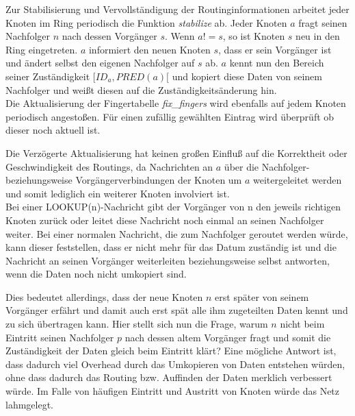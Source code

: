 Zur Stabilisierung und Vervollständigung der Routinginformationen arbeitet jeder Knoten im Ring periodisch die Funktion \emph{stabilize} ab. Jeder Knoten $a$ fragt seinen Nachfolger $n$ nach dessen Vorgänger $s$. Wenn $a != s$, so ist Knoten $s$ neu in den Ring eingetreten. $a$ informiert den neuen Knoten $s$, dass er sein Vorgänger ist und ändert selbst den eigenen Nachfolger auf $s$ ab. $a$ kennt nun den Bereich seiner Zuständigkeit $[ID_a, PRED(a)[$ und kopiert diese Daten von seinem Nachfolger und weißt diesen auf die Zuständigkeitsänderung hin.\\
Die Aktualisierung der Fingertabelle \emph{fix\_fingers} wird ebenfalls auf jedem Knoten periodisch angestoßen. Für einen zufällig gewählten Eintrag wird überprüft ob dieser noch aktuell ist.

Die Verzögerte Aktualisierung hat keinen großen Einfluß auf die Korrektheit oder Geschwindigkeit des Routings, da Nachrichten an $a$ über die Nachfolger- beziehungsweise Vorgängerverbindungen der Knoten um $a$ weitergeleitet werden und somit lediglich ein weiterer Knoten involviert ist.\\
Bei einer LOOKUP(n)-Nachricht gibt der Vorgänger von n den jeweils richtigen Knoten zurück oder leitet diese Nachricht noch einmal an seinen Nachfolger weiter. Bei einer normalen Nachricht, die zum Nachfolger geroutet werden würde, kann dieser feststellen, dass er nicht mehr für das Datum zuständig ist und die Nachricht an seinen Vorgänger weiterleiten beziehungsweise selbst antworten, wenn die Daten noch nicht umkopiert sind. 

Dies bedeutet allerdings, dass der neue Knoten $n$ erst später von seinem Vorgänger erfährt und damit auch erst spät alle ihm zugeteilten Daten kennt und zu sich übertragen kann. Hier stellt sich nun die Frage, warum $n$ nicht beim Eintritt seinen Nachfolger $p$ nach dessen altem Vorgänger fragt und somit die Zuständigkeit der Daten gleich beim Eintritt klärt? Eine mögliche Antwort ist, dass dadurch viel Overhead durch das Umkopieren von Daten entstehen würden, ohne dass dadurch das Routing bzw. Auffinden der Daten merklich verbessert würde. Im Falle von häufigen Eintritt und Austritt von Knoten würde das Netz lahmgelegt.

